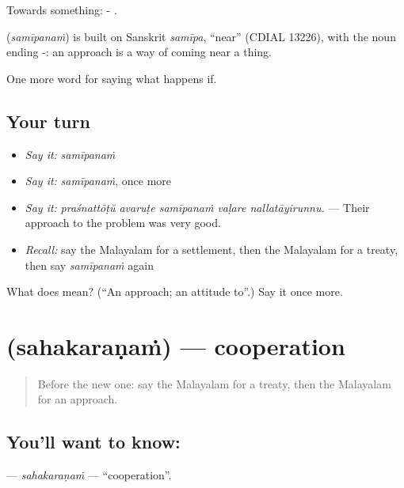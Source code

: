 Towards something: - .

\begin{cousinweb}
\textbf{} (\emph{samīpanaṁ}) is built on Sanskrit \emph{samīpa}, \textquotedblleft{}near\textquotedblright{} (CDIAL 13226), with the noun ending -: an approach is a way of coming near a thing.
\end{cousinweb}

\begin{grammarlens}[title={What you've built}]
One more word for saying what happens if.
\end{grammarlens}

\subsection*{Your turn}
\begin{itemize}
\raggedright
  \item \emph{Say it:} \emph{samīpanaṁ}
  \item \emph{Say it:} \emph{samīpanaṁ}, once more
  \item \emph{Say it:} \emph{praśnattōṭŭ avaruṭe samīpanaṁ vaḷare nallatāyirunnu.} — Their approach to the problem was very good.
  \item \emph{Recall:} say the Malayalam for a settlement, then the Malayalam for a treaty, then say \emph{samīpanaṁ} again
\end{itemize}

\begin{tcolorbox}[breakable,colback=teal!4,colframe=teal!35!black,title={Before you move on}]
What does  mean? (\textquotedblleft{}An approach; an attitude to\textquotedblright{}.) Say it once more.
\end{tcolorbox}
\section[\texorpdfstring{\ml{സഹകരണം} (sahakaraṇaṁ)}{സഹകരണം (sahakaraṇaṁ)}]{ (sahakaraṇaṁ) — cooperation}

\label{lesson:ML-C452-sahakaranam}



\begin{quote}
Before the new one: say the Malayalam for a treaty, then the Malayalam for an approach.
\end{quote}

\subsection*{You'll want to know: }
\textbf{} — \emph{sahakaraṇaṁ} — \textquotedblleft{}cooperation\textquotedblright{}.

